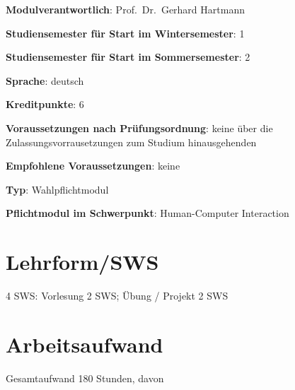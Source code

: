 \begin{modulHead}
\textbf{Modulverantwortlich}: Prof.~Dr.~Gerhard
Hartmann
\end{modulHead}
\begin{modulHead}
\textbf{Studiensemester für
Start im Wintersemester}:
1
\end{modulHead}
\begin{modulHead}
\textbf{Studiensemester für Start
im Sommersemester}:
2
\end{modulHead}
\begin{modulHead}
\textbf{Sprache}:
deutsch
\end{modulHead}
\begin{modulHead}
\textbf{Kreditpunkte}:
6
\end{modulHead}
\begin{modulHead}
\textbf{Voraussetzungen nach
Prüfungsordnung}: keine über die Zulassungsvorrausetzungen zum Studium
hinausgehenden
\end{modulHead}
\begin{modulHead}
\textbf{Empfohlene
Voraussetzungen}: keine
\end{modulHead}
\begin{modulHead}
\textbf{Typ}:
Wahlpflichtmodul
\end{modulHead}
\begin{modulHead}
\textbf{Pflichtmodul
im Schwerpunkt}: Human-Computer Interaction
\end{modulHead}


\section*{Lehrform/SWS\label{/mi-2017/modulbeschreibungen-master/MA_HCI_Sketching_and_Designing_for_User_Experience}}\label{lehrformswspathlabelmi-2017modulbeschreibungen-mastermaux5fhciux5fsketchingux5fandux5fdesigningux5fforux5fuserux5fexperience}

4 SWS: Vorlesung 2 SWS; Übung / Projekt 2 SWS

\section*{Arbeitsaufwand\label{/mi-2017/modulbeschreibungen-master/MA_HCI_Sketching_and_Designing_for_User_Experience}}\label{arbeitsaufwandpathlabelmi-2017modulbeschreibungen-mastermaux5fhciux5fsketchingux5fandux5fdesigningux5fforux5fuserux5fexperience}

Gesamtaufwand 180 Stunden, davon

